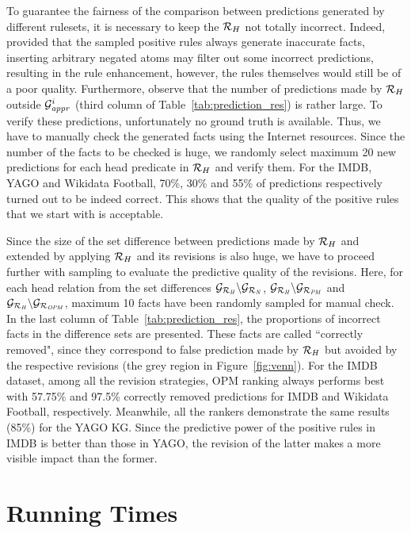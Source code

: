 To guarantee the fairness of the comparison between predictions generated by different rulesets, it is necessary to keep the $\mathcal{R}_H$ not totally incorrect. Indeed, provided that the sampled positive rules always generate inaccurate facts, inserting arbitrary negated atoms may filter out some incorrect predictions, resulting in the rule enhancement, however, the rules themselves would still be of a poor quality. Furthermore, observe that the number of predictions made by $\mathcal{R}_H$ outside $\mathcal{G}^i_{\mathit{appr}}$ (third column of Table~\ref{tab:prediction_res}) is rather large. To verify these predictions, unfortunately no ground truth is available. Thus, we have to manually check the generated facts using the Internet resources. Since the number of the facts to be checked is huge, we randomly select maximum 20 new predictions for each head predicate in $\mathcal{R}_H$ and verify them. For the IMDB, YAGO and Wikidata Football, 70\%, 30\% and 55\% of predictions respectively turned out to be indeed correct. This shows that the quality of the positive rules that we start with is acceptable.

Since the size of the set difference between predictions made by $\mathcal{R}_H$ and extended by applying $\mathcal{R}_H$ and its revisions is also huge, we have to proceed further with sampling to evaluate the predictive quality of the revisions. Here, for each head relation from the set differences $\mathcal{G}_{\mathcal{R}_{\mathit{H}}}\backslash \mathcal{G}_{\mathcal{R}_{\mathit{N}}}$, $\mathcal{G}_{\mathcal{R}_{\mathit{H}}}\backslash \mathcal{G}_{\mathcal{R}_{\mathit{PM}}}$ and $\mathcal{G}_{\mathcal{R}_{\mathit{H}}}\backslash \mathcal{G}_{\mathcal{R}_{\mathit{OPM}}}$, maximum 10 facts have been randomly sampled for manual check. In the last column of Table~\ref{tab:prediction_res}, the proportions of incorrect facts in the difference sets are presented. These facts are called ``correctly removed", since they correspond to false prediction made by $\mathcal{R}_H$ but avoided by the respective revisions (the grey region in Figure~\ref{fig:venn}). For the IMDB dataset, among all the revision strategies, OPM ranking always performs best with 57.75\% and 97.5\% correctly removed predictions for IMDB and Wikidata Football, respectively. Meanwhile, all the rankers demonstrate the same results (85\%) for the YAGO KG. Since the predictive power of the positive rules in IMDB is better than those in YAGO, the revision of the latter makes a more visible impact than the former.

\section{Running Times}


